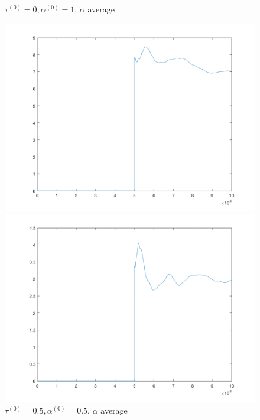 \documentclass{siamart1116}
\begin{document}
\begin{figure}[!htb]
    \begin{minipage}{0.48\textwidth}
        \centering
        \caption{$\tau^{(0)} = 0, \alpha^{(0)} = 1$, $\alpha$ average}
        \includegraphics[width=\linewidth]{zero_one_alpha_avg.png}
    \end{minipage} \hfill
    \begin{minipage}{0.48\textwidth}
        \centering
        \caption{$\tau^{(0)} = 0.5, \alpha^{(0)} = 0.5$, $\alpha$ average}
        \includegraphics[width=\linewidth]{half_half_alpha_avg.png}
    \end{minipage}
\end{figure}
\end{document}
